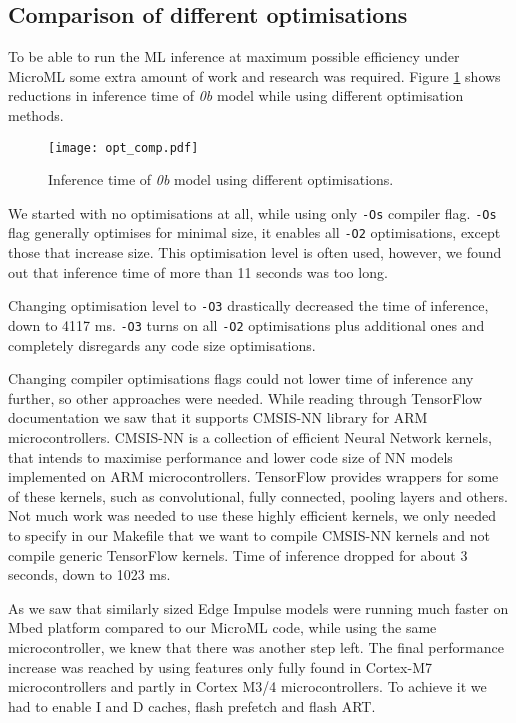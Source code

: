 \subsection{ Comparison of different optimisations}

To be able to run the ML inference at maximum possible efficiency under MicroML some extra amount of work and research was required.
Figure \ref{opt_comp} shows reductions in inference time of \textit{0b} model while using different optimisation methods.
\newline

\begin{figure}[ht]
    \centering
    \texttt{[image: opt\_comp.pdf]}
    \caption{ Inference time of \textit{0b} model using different optimisations.}
    \label{opt_comp}
\end{figure}

We started with no optimisations at all, while using only \verb|-Os| compiler flag.
\verb|-Os| flag generally optimises for minimal size, it enables all \verb|-O2| optimisations, except those that increase size.
This optimisation level is often used, however, we found out that inference time of more than 11 seconds was too long.

Changing optimisation level to \verb|-O3| drastically decreased the time of inference, down to 4117 \si{\milli\second}.
\verb|-O3| turns on all \verb|-O2| optimisations plus additional ones and completely disregards any code size optimisations.

Changing compiler optimisations flags could not lower time of inference any further, so other approaches were needed.
While reading through TensorFlow documentation we saw that it supports CMSIS-NN library for ARM microcontrollers.
CMSIS-NN is a collection of efficient Neural Network kernels, that intends to maximise performance and lower code size of NN models implemented on ARM microcontrollers.
TensorFlow provides wrappers for some of these kernels, such as convolutional, fully connected, pooling layers and others.
Not much work was needed to use these highly efficient kernels, we only needed to specify in our Makefile that we want to compile CMSIS-NN kernels and not compile generic TensorFlow kernels. 
Time of inference dropped for about 3 seconds, down to 1023 \si{\milli\second}.

As we saw that similarly sized Edge Impulse models were running much faster on Mbed platform compared to our MicroML code, while using the same microcontroller, we knew that there was another step left.
The final performance increase was reached by using features only fully found in Cortex-M7 microcontrollers and partly in Cortex M3/4 microcontrollers. 
To achieve it we had to enable I and D caches, flash prefetch and flash ART.

